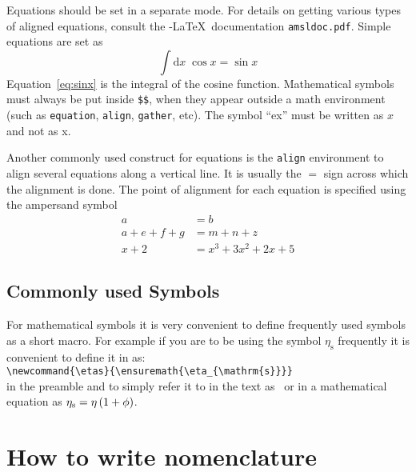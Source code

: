 Equations should be set in a separate mode.  For details on getting
various types of aligned equations, consult the \AmS-\LaTeX\
documentation \verb|amsldoc.pdf|. Simple equations are set as
\begin{equation}
\label{eq:sinx}
\int \mathrm{d}x \; \cos x =  \sin x
\end{equation}
Equation~\eqref{eq:sinx} is the integral of the cosine
function. Mathematical symbols must always be put inside \verb|$$|,
when they appear outside a math environment (such as \verb|equation|,
\verb|align|, \verb|gather|, etc).  The symbol ``ex'' must be written as
$x$ and not as x.  

Another commonly used construct for equations is the \verb|align|
environment to align several equations along a vertical line. It is
usually the $=$ sign across which the alignment is done.  The
point of alignment for each equation is specified using the ampersand symbol 
\begin{align}
a &= b  \\
a + e + f + g & = m + n + z \\
x + 2 & = x^{3} + 3 x^{2} + 2 x + 5
\end{align}

\subsection{Commonly used Symbols}
For mathematical symbols it is very convenient to define frequently
used symbols as a short macro. For example if you are to be using the
symbol $\eta_{\mathrm{s}}$ frequently it is convenient to define it in
as:\\
\verb|\newcommand{\etas}{\ensuremath{\eta_{\mathrm{s}}}}| \\
in the preamble and to simply refer it to in the text as \etas\ or in
a mathematical equation as $\etas = \eta \, ( 1 + \phi)$.
%

\section{How to write nomenclature} 

